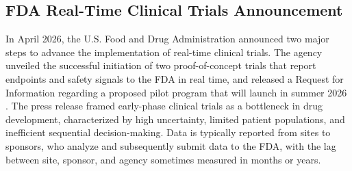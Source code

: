 
\subsection{FDA Real-Time Clinical Trials Announcement}
\label{sec:intro-fda}

In April 2026, the U.S. Food and Drug Administration announced two
major steps to advance the implementation of real-time clinical trials.
The agency unveiled the successful initiation of two proof-of-concept
trials that report endpoints and safety signals to the FDA in real
time, and released a Request for Information regarding a proposed pilot
program that will launch in summer 2026 \cite{fda2026realtime}. The
press release framed early-phase clinical trials as a bottleneck in
drug development, characterized by high uncertainty, limited patient
populations, and inefficient sequential decision-making. Data is
typically reported from sites to sponsors, who analyze and subsequently
submit data to the FDA, with the lag between site, sponsor, and agency
sometimes measured in months or years.

